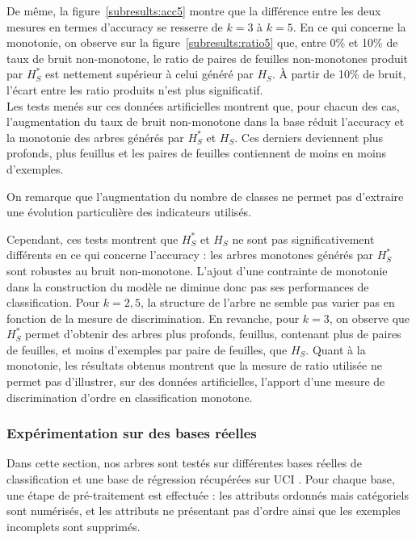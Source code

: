 \documentclass[a4paper]{article}
\newcommand{\figref}[1]{figure~\ref{#1}}
\begin{document}
De même, la \figref{subresults:acc5} montre que la différence entre les deux
mesures en termes d'accuracy se resserre de $k=3$ à $k=5$. En ce qui concerne la
monotonie, on observe sur la \figref{subresults:ratio5} que, entre 0\% et 10\%
de taux de bruit non-monotone, le ratio de paires de feuilles non-monotones
produit par $H^*_S$ est nettement supérieur à celui généré par $H_S$. À partir
de 10\% de bruit, l'écart entre les ratio produits n'est plus significatif. \\

Les tests menés sur ces données artificielles montrent que, pour chacun des cas,
l'augmentation du taux de bruit non-monotone dans la base réduit l'accuracy et
la monotonie des arbres générés par $H^*_S$ et $H_S$. Ces derniers deviennent
plus profonds, plus feuillus et les paires de feuilles contiennent de moins en
moins d'exemples.

On remarque que l'augmentation du nombre de classes ne permet pas d'extraire une
évolution particulière des indicateurs utilisés.

Cependant, ces tests montrent que $H^*_S$ et $H_S$ ne sont pas significativement
différents en ce qui concerne l'accuracy : les arbres monotones générés par
$H^*_S$ sont robustes au bruit non-monotone. L'ajout d'une contrainte de
monotonie dans la construction du modèle ne diminue donc pas ses performances de
classification. Pour $k=2,5$, la structure de l'arbre ne semble pas varier pas
en fonction de la mesure de discrimination. En revanche, pour $k=3$, on observe
que $H^*_S$ permet d'obtenir des arbres plus profonds, feuillus, contenant plus
de paires de feuilles, et moins d'exemples par paire de feuilles, que $H_S$.
Quant à la monotonie, les résultats obtenus montrent que la mesure de ratio
utilisée ne permet pas d'illustrer, sur des données artificielles, l'apport
d'une mesure de discrimination d'ordre en classification monotone.


\subsubsection{Expérimentation sur des bases réelles}

Dans cette section, nos arbres sont testés sur différentes bases réelles de
classification et une base de régression récupérées sur UCI \cite{uci}. Pour
chaque base, une étape de pré-traitement est effectuée : les attributs ordonnés
mais catégoriels sont numérisés, et les attributs ne présentant pas d'ordre
ainsi que les exemples incomplets sont supprimés.
\end{document}
